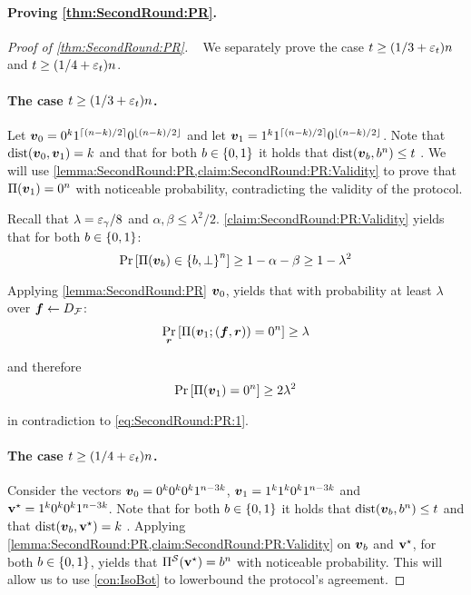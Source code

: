 \paragraph{Proving \cref{thm:SecondRound:PR}.}
\begin{proof}[Proof of \cref{thm:SecondRound:PR}]~
We separately prove the case $t \ge (1/3 + \varepsilon_t)n$ and $t \ge (1/4 + \varepsilon_t)n$.



\paragraph{The case $t \ge (1/3 + \varepsilon_t)n$.}
Let ${ \boldsymbol{v}}_0= 0^k 1^{\left\lceil (n-k)/2 \right\rceil} 0^{\left \lfloor(n-k)/2 \right \rfloor} $ and let ${ \boldsymbol{v}}_1= 1^k 1^{\left\lceil (n-k)/2 \right\rceil} 0^{\left \lfloor(n-k)/2 \right \rfloor} $. Note  that $\mathrm{dist}({ \boldsymbol{v}}_0,{ \boldsymbol{v}}_1)=k$ and that for both $b\in \{0,1\}$ it holds that $\mathrm{dist}({ \boldsymbol{v}}_b,b^n) \le t$ .  We will use  \cref{lemma:SecondRound:PR,claim:SecondRound:PR:Validity}  to prove that  $\Pi({ \boldsymbol{v}}_1) = 0^n$ with  noticeable probability, contradicting the validity of the protocol.

Recall that $\lambda = \varepsilon_\gamma/8$ and $\alpha,\beta \le \lambda^2/2$.    \cref{claim:SecondRound:PR:Validity} yields that for both $b\in\{0,1\}$:
\begin{align}\label{eq:SecondRound:PR:1}
\Pr_{}\left[\Pi({ \boldsymbol{v}}_b) \in  \left\{b,\perp\right\}^n\right] \ge 1- \alpha - \beta \ge 1- \lambda^2
\end{align}
Applying \cref{lemma:SecondRound:PR}  \wrt ${ \boldsymbol{v}}_0$, yields  that  with probability  at least $ \lambda$ over  ${ \boldsymbol{f}} \gets D_{\cal F} $:
\begin{align*}
\Pr_{{ \boldsymbol{r}}}\left[\Pi({ \boldsymbol{v}}_1;({ \boldsymbol{f}},{ \boldsymbol{r}})) = 0^n\right]\ge \lambda
\end{align*}

and therefore
\begin{align*}
\Pr_{}\left[\Pi({ \boldsymbol{v}}_1) = 0^n\right]\ge  2 \lambda^2
\end{align*}
in contradiction to \cref{eq:SecondRound:PR:1}.



\paragraph{The case $t \ge (1/4 + \varepsilon_t)n$.} Consider the  vectors ${ \boldsymbol{v}}_0= 0^k 0^k 0^k 1^{n-3k}$,  ${ \boldsymbol{v}}_1= 1^k 1^k 0^k 1^{n-3k}$ and $\mathbf{v}^{\star} =1^k 0^k 0^k  1^{n-3k}$. Note that for both $b\in \{0,1\}$ it holds that $\mathrm{dist}({ \boldsymbol{v}}_b,b^n) \le t$ and that $\mathrm{dist}({ \boldsymbol{v}}_b,\mathbf{v}^{\star})=k$ . Applying  \cref{lemma:SecondRound:PR,claim:SecondRound:PR:Validity}  on ${ \boldsymbol{v}}_b$ and $\mathbf{v}^{\star}$, for both $b\in \{0,1\}$, yields that  $\Pi^{\cal{S}}(\mathbf{v}^{\star}) = b^n$ with  noticeable probability. This will allow us to use \cref{con:IsoBot} to lowerbound the protocol's agreement.


\end{proof}
